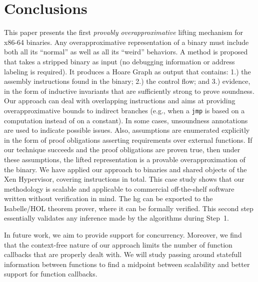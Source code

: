 \section{Conclusions}


This paper presents the first \emph{provably overapproximative} lifting mechanism for x86-64 binaries.
Any overapproximative representation of a binary must include both all its ``normal'' as well as all its ``weird'' behaviors.
A method is proposed that takes a stripped binary as input (no debugging information or address labeling is required).
It produces a Hoare Graph as output that contains:
1.) the assembly instructions found in the binary;
2.) the control flow;
and 3.) evidence, in the form of inductive invariants that are sufficiently strong to prove soundness.
Our approach can deal with overlapping instructions and aims at providing overapproximative bounds to indirect branches (e.g., when a \texttt{jmp} is based on a computation instead of on a constant).
In some cases, unsoundness annotations are used to indicate possible issues.
Also, assumptions are enumerated explicitly in the form of proof obligations asserting requirements over external functions.
If our technique succeeds and the proof obligations are proven true, then under these assumptions, the lifted representation is a provable overapproximation of the binary.
We have applied our approach to binaries and shared objects of the Xen Hypervisor, covering \numberinstructions{} instructions in total.
This case study shows that our methodology is scalable and applicable to commercial off-the-shelf software written without verification in mind.
The \ac{hg} can be exported to the Isabelle/HOL theorem prover, where it can be formally verified.
This second step essentially validates any inference made by the algorithms during Step~1.



In future work, we aim to provide support for concurrency.
Moreover, we find that the context-free nature of our approach limits the number of function callbacks that are properly dealt with.
We will study passing around statefull information between functions to find a midpoint between scalability and better support for function callbacks.


